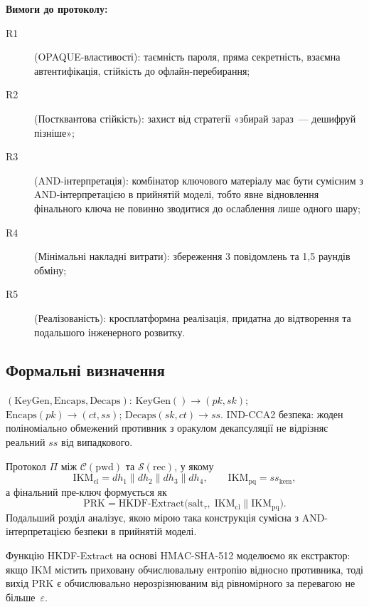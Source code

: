 \documentclass{llncs}
\begin{document}
\textbf{Вимоги до протоколу:}
\begin{description}
  \item[R1] (OPAQUE-властивості): таємність пароля, пряма секретність,
        взаємна автентифікація, стійкість до офлайн-перебирання;
  \item[R2] (Постквантова стійкість): захист від стратегії «збирай
        зараз~--- дешифруй пізніше»;
  \item[R3] (AND-інтерпретація): комбінатор ключового матеріалу має
        бути сумісним з AND-інтерпретацією в прийнятій моделі, тобто
        явне відновлення фінального ключа не повинно зводитися до
        ослаблення лише одного шару;
  \item[R4] (Мінімальні накладні витрати): збереження 3 повідомлень та
        1,5 раундів обміну;
  \item[R5] (Реалізованість): кросплатформна реалізація, придатна до
        відтворення та подальшого інженерного розвитку.
\end{description}

\subsection{Формальні визначення}

\begin{definition}[KEM]
$(\mathrm{KeyGen}, \mathrm{Encaps}, \mathrm{Decaps})$:
$\mathrm{KeyGen}() \to (pk, sk)$;
$\mathrm{Encaps}(pk) \to (ct, ss)$;
$\mathrm{Decaps}(sk, ct) \to ss$.
IND-CCA2 безпека: жоден поліноміально обмежений противник з оракулом
декапсуляції не відрізняє реальний $ss$ від випадкового.
\end{definition}

\begin{definition}
Протокол $\Pi$ між $\mathcal{C}(\mathrm{pwd})$ та
$\mathcal{S}(\mathrm{rec})$, у якому
\[
  \mathrm{IKM}_{\mathrm{cl}} = dh_1 \| dh_2 \| dh_3 \| dh_4,\qquad
  \mathrm{IKM}_{\mathrm{pq}} = ss_{\mathrm{kem}},
\]
а фінальний пре-ключ формується як
\[
  \mathrm{PRK} = \mathrm{HKDF\text{-}Extract}\!\bigl(
    \mathrm{salt}_{\tau},\;
    \mathrm{IKM}_{\mathrm{cl}} \| \mathrm{IKM}_{\mathrm{pq}}\bigr).
\]
Подальший розділ аналізує, якою мірою така конструкція сумісна з
AND-інтерпретацією безпеки в прийнятій моделі.
\end{definition}

\begin{definition}
Функцію HKDF-Extract на основі HMAC-SHA-512 моделюємо як екстрактор:
якщо $\mathrm{IKM}$ містить приховану обчислювальну ентропію відносно
противника, тоді вихід PRK є обчислювально нерозрізнюваним від
рівномірного за перевагою не більше~$\varepsilon$.
\end{definition}
\end{document}
